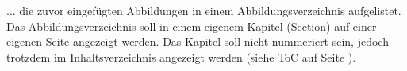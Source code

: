 
... die zuvor eingefügten Abbildungen in einem Abbildungsverzeichnis aufgelistet. Das Abbildungsverzeichnis soll in einem eigenem Kapitel (Section) auf einer eigenen Seite angezeigt werden. Das Kapitel soll nicht nummeriert sein, jedoch trotzdem im Inhaltsverzeichnis angezeigt werden (siehe ToC auf Seite \pageref{toc}).
